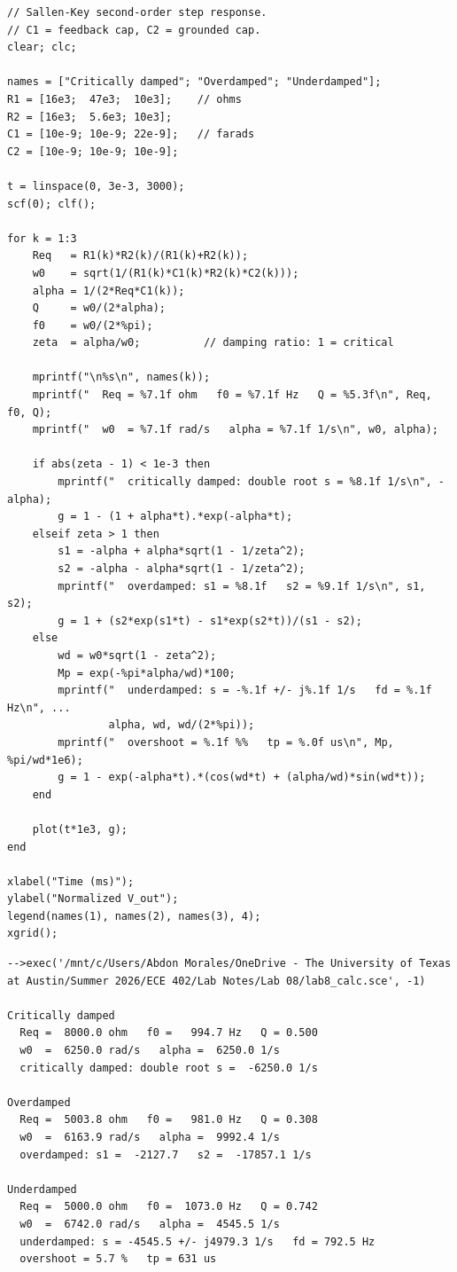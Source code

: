 \documentclass[11pt]{article}
\begin{document}
\begin{lstlisting}[style=scilab, caption={SciLab: damping parameters and step response}]
// Sallen-Key second-order step response.
// C1 = feedback cap, C2 = grounded cap.
clear; clc;

names = ["Critically damped"; "Overdamped"; "Underdamped"];
R1 = [16e3;  47e3;  10e3];    // ohms
R2 = [16e3;  5.6e3; 10e3];
C1 = [10e-9; 10e-9; 22e-9];   // farads
C2 = [10e-9; 10e-9; 10e-9];

t = linspace(0, 3e-3, 3000);
scf(0); clf();

for k = 1:3
    Req   = R1(k)*R2(k)/(R1(k)+R2(k));
    w0    = sqrt(1/(R1(k)*C1(k)*R2(k)*C2(k)));
    alpha = 1/(2*Req*C1(k));
    Q     = w0/(2*alpha);
    f0    = w0/(2*%pi);
    zeta  = alpha/w0;          // damping ratio: 1 = critical

    mprintf("\n%s\n", names(k));
    mprintf("  Req = %7.1f ohm   f0 = %7.1f Hz   Q = %5.3f\n", Req, f0, Q);
    mprintf("  w0  = %7.1f rad/s   alpha = %7.1f 1/s\n", w0, alpha);

    if abs(zeta - 1) < 1e-3 then
        mprintf("  critically damped: double root s = %8.1f 1/s\n", -alpha);
        g = 1 - (1 + alpha*t).*exp(-alpha*t);
    elseif zeta > 1 then
        s1 = -alpha + alpha*sqrt(1 - 1/zeta^2);
        s2 = -alpha - alpha*sqrt(1 - 1/zeta^2);
        mprintf("  overdamped: s1 = %8.1f   s2 = %9.1f 1/s\n", s1, s2);
        g = 1 + (s2*exp(s1*t) - s1*exp(s2*t))/(s1 - s2);
    else
        wd = w0*sqrt(1 - zeta^2);
        Mp = exp(-%pi*alpha/wd)*100;
        mprintf("  underdamped: s = -%.1f +/- j%.1f 1/s   fd = %.1f Hz\n", ...
                alpha, wd, wd/(2*%pi));
        mprintf("  overshoot = %.1f %%   tp = %.0f us\n", Mp, %pi/wd*1e6);
        g = 1 - exp(-alpha*t).*(cos(wd*t) + (alpha/wd)*sin(wd*t));
    end

    plot(t*1e3, g);
end

xlabel("Time (ms)");
ylabel("Normalized V_out");
legend(names(1), names(2), names(3), 4);
xgrid();
\end{lstlisting}

\begin{lstlisting}[caption={SciLab runtime output}]
-->exec('/mnt/c/Users/Abdon Morales/OneDrive - The University of Texas at Austin/Summer 2026/ECE 402/Lab Notes/Lab 08/lab8_calc.sce', -1)

Critically damped
  Req =  8000.0 ohm   f0 =   994.7 Hz   Q = 0.500
  w0  =  6250.0 rad/s   alpha =  6250.0 1/s
  critically damped: double root s =  -6250.0 1/s

Overdamped
  Req =  5003.8 ohm   f0 =   981.0 Hz   Q = 0.308
  w0  =  6163.9 rad/s   alpha =  9992.4 1/s
  overdamped: s1 =  -2127.7   s2 =  -17857.1 1/s

Underdamped
  Req =  5000.0 ohm   f0 =  1073.0 Hz   Q = 0.742
  w0  =  6742.0 rad/s   alpha =  4545.5 1/s
  underdamped: s = -4545.5 +/- j4979.3 1/s   fd = 792.5 Hz
  overshoot = 5.7 %   tp = 631 us

\end{lstlisting}
\end{document}
